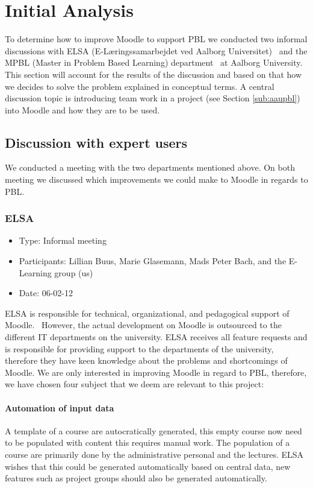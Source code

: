\section{Initial Analysis}
\label{sec:initialAnalysis}
To determine how to improve Moodle to support PBL we conducted two informal discussions with  ELSA (E-Læringssamarbejdet ved Aalborg Universitet)~\cite{elsa} and the MPBL (Master in Problem Based Learning) department~\cite{mpbl} at Aalborg University.
This section will account for the results of the discussion and based on that how we decides to solve the problem explained in conceptual terms.
A central discussion topic is introducing team work in a project (see Section \ref{sub:aaupbl}) into Moodle and how they are to be used.     

\subsection{Discussion with expert users}  
\label{sub:expertUsers} 
We conducted a meeting with the two departments mentioned above. On both meeting we discussed which improvements we could make to Moodle in regards to PBL.  

\subsubsection{ELSA}
\begin{itemize}
	\item Type: Informal meeting
	\item Participants: Lillian Buus, Marie Glasemann, Mads Peter Bach, and the E-Learning group (us) 
	\item Date: 06-02-12
\end{itemize}
ELSA is responsible for technical, organizational, and pedagogical support of Moodle.~\cite{elsa} 
However, the actual development on Moodle is outsourced to the different IT departments on the university. 
ELSA receives all feature requests and is responsible for providing support to the departments of the university, therefore they have keen knowledge about the problems and shortcomings of Moodle. 
We are only interested in improving Moodle in regard to PBL, therefore, we have chosen four subject that we deem are relevant to this project:

\paragraph{Automation of input data} A template of a course are autocratically generated, this empty course now need to be populated with content this requires manual work. 
The population of a course are primarily done by the administrative personal and the lectures. 
ELSA wishes that this could be generated automatically based on central data, new features such as project groups should also be generated automatically.     
